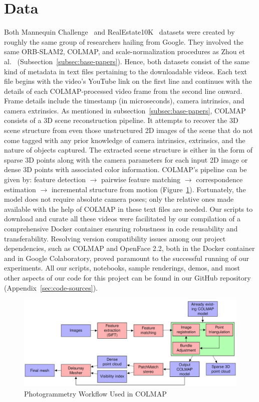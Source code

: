 \section{Data}\label{sec:data} 

Both Mannequin Challenge~\cite{li2019learning} and RealEstate10K~\cite{zhou2018stereo} datasets were created by roughly the same group of researchers hailing from Google. They involved the same ORB-SLAM2, COLMAP, and scale-normalization procedures as Zhou et al.~\cite{zhou2018stereo} (Subsection~\ref{subsec:base-papers}). Hence, both datasets consist of the same kind of metadata in text files pertaining to the downloadable videos. Each text file begins with the video’s YouTube link on the first line and continues with the details of each COLMAP-processed video frame from the second line onward. Frame details include the timestamp (in microseconds), camera intrinsics, and camera extrinsics. As mentioned in subsection~\ref{subsec:base-papers}, COLMAP consists of a 3D scene reconstruction pipeline. It attempts to recover the 3D scene structure from even those unstructured 2D images of the scene that do not come tagged with any prior knowledge of camera intrinsics, extrinsics, and the nature of objects captured. The extracted scene structure is either in the form of sparse 3D points along with the camera parameters for each input 2D image or dense 3D points with associated color information. COLMAP's pipeline can be given by: feature detection $\rightarrow$ pairwise feature matching  $\rightarrow$ correspondence estimation $\rightarrow$ incremental structure from motion (Figure~\ref{fig:colmap-photogrammetry-pipeline}). Fortunately, the model does not require absolute camera poses; only the relative ones made available with the help of COLMAP in these text files are needed. Our scripts to download and curate all these videos were facilitated by our compilation of a comprehensive Docker container ensuring robustness in code reusability and transferability. Resolving version compatibility issues among our project dependencies, such as COLMAP and OpenFace 2.2, both in the Docker container and in Google Colaboratory, proved paramount to the successful running of our experiments. All our scripts, notebooks, sample renderings, demos, and most other aspects of our code for this project can be found in our GitHub repository (Appendix~\ref{sec:code-sources}).

\begin{figure}[!h]
    \includegraphics[width=1\columnwidth]{figures/colmap-photogrammetry-pipeline.png}
    \caption{Photogrammetry Workflow Used in COLMAP~\cite{pinard_does_2021}}
    \label{fig:colmap-photogrammetry-pipeline}
\end{figure}
    
